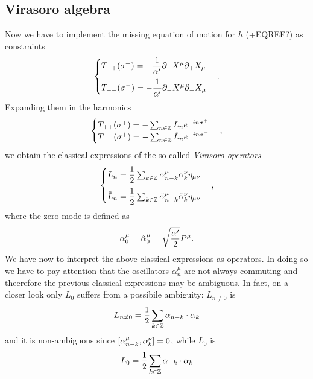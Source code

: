 \subsection{Virasoro algebra}
Now we have to implement the missing equation of motion for $h$ (+EQREF?) as constraints
\begin{equation}
    \begin{cases}
        T_{++}(\sigma^+) = -\dfrac{1}{\alpha'}\partial_+X^\mu\partial_+X_\mu \\[2ex]
        T_{--}(\sigma^-) = -\dfrac{1}{\alpha'}\partial_-X^\mu\partial_-X_\mu
    \end{cases}.
\end{equation}
Expanding them in the harmonics 
\begin{equation}
    \begin{cases}
        T_{++}(\sigma^+) = -\sum_{n\in\mathbb{Z}}L_n e^{-in\sigma^+} \\
        T_{--}(\sigma^+) = -\sum_{n\in\mathbb{Z}}\tilde{L}_n e^{-in\sigma^-}
    \end{cases},
\end{equation}
we obtain the classical expressions of the so-called \emph{Virasoro operators}
\begin{equation}
    \begin{cases}
        L_n = \dfrac{1}{2}\sum_{k\in\mathbb{Z}}\alpha^\mu_{n - k}\alpha^\nu_k\eta_{\mu\nu} \\[2ex]
        \tilde{L}_n = \dfrac{1}{2}\sum_{k\in\mathbb{Z}}\tilde{\alpha}^\mu_{n - k}\tilde{\alpha}^\nu_k\eta_{\mu\nu}
    \end{cases},
\end{equation}
where the zero-mode is defined as 
\begin{equation}
\label{eq: zero-mode oscillator}
    \alpha_0^\mu = \tilde{\alpha}_0^\mu = \sqrt{\frac{\alpha'}{2}}P^\mu.
\end{equation}
We have now to interpret the above classical expressions as operators. In doing so we have to pay attention that the oscillators $\alpha_n^\mu$ are not always commuting and theerefore the previous classical expressions may be ambiguous. In fact, on a closer look only $L_0$ suffers from a possibile ambiguity: $L_{n \neq 0}$ is 
\begin{equation}
    L_{n \neq 0} = \frac{1}{2}\sum_{k\in\mathbb{Z}}\alpha_{n - k}\cdot \alpha_k
\end{equation}
and it is non-ambiguous since $[\alpha^\mu_{n - k},\alpha^\nu_k] = 0$, while $L_0$ is 
\begin{equation}
    L_0 = \frac{1}{2}\sum_{k\in\mathbb{Z}}\alpha_{-k}\cdot \alpha_k
\end{equation}
